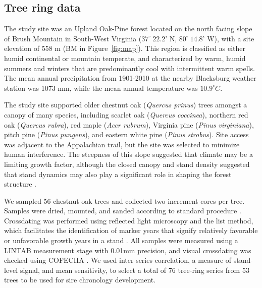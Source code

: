 
\subsection{Tree ring data}

The study site was an Upland Oak-Pine forest located on the north
facing slope of Brush Mountain in South-West Virginia  ($37^{\circ}
\ 22.2$' N, $80^{\circ}\ 14.8$' W), with a site elevation of 558 m
(BM in Figure~\ref{fig:map}). This region is classified as either
humid continental or mountain temperate, and characterized by warm,
humid summers and winters that are predominantly cool with intermittent
warm spells. The mean annual precipitation from 1901-2010 at the nearby
Blacksburg weather station was 1073 mm, while the mean annual temperature
was $10.9^{\circ} C$.

The study site supported older chestnut oak (\textit{Quercus
prinus}) trees amongst a canopy of many species, including scarlet
oak (\textit{Quercus coccinea}), northern red oak (\textit{Quercus
rubra}), red maple (\textit{Acer rubrum}), Virginia pine (\textit{Pinus
virginiana}), pitch pine (\textit{Pinus pungens}), and eastern white pine
(\textit{Pinus strobus}). Site access was adjacent to the Appalachian
trail, but the site was selected to minimize human interference. The
steepness of this slope suggested that climate may be a limiting growth
factor, although the closed canopy and stand density suggested that
stand dynamics may also play a significant role in shaping the forest
structure \cite{fritts1976tree}.

We sampled 56 chestnut oak trees and collected two increment cores per
tree. Samples were dried, mounted, and sanded according to standard
procedure \cite{stokes1996introduction}. Crossdating was performed using
reflected light microscopy and the list method, which facilitates the
identification of marker years that signify relatively favorable or
unfavorable growth years in a stand \cite{yamaguchi1991simple}. All
samples were measured using a LINTAB measurement stage with
0.01mm precision, and visual crossdating was checked using COFECHA
\cite{holmes1983computer}. We used inter-series correlation, a measure
of stand-level signal, and mean sensitivity, to select a total of 76
tree-ring series from 53 trees to be used for sire chronology development.

